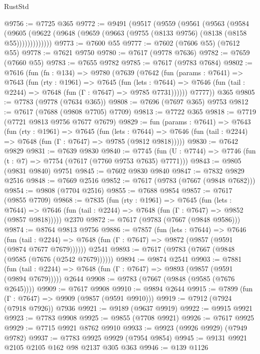 \begin{lexlean}{RustStd}
\begin{coremodule}
@9756 := @7725 @365
@9772 := @9491
    (@9517
      (@9559
        (@9561
          (@9563
            (@9584
              (@9605 (@9622 (@9648 (@9659 (@9663 (@9755 (@8133 @9756) (@8138 (@8158 @55)))))))))))))
@9773 := @7600 @55
@9777 := @7602 (@7606 @55) (@7612 @55)
@9778 := @7621 @9750
@9780 := @7617 (@9778 @7636)
@9782 := @7659 (@7660 @55)
@9783 := @7655 @9782
@9785 := @7617 (@9783 @7684)
@9802 := @7616
    (fun (fn : @134) =>
    @9780
      (@7639
        (@7642
          (fun (params : @7641) =>
          @7643
            (fun (rty : @1961) =>
            @7645
              (fun (lets : @7644) =>
              @7646 (fun (tail : @2244) => @7648 (fun (Γ : @7647) => @9785 @7731))))))
        @7777))
    @365
@9805 := @7783 (@9778 (@7634 @365))
@9808 := @7696 (@7697 @365) @9753
@9812 := @7617 (@7688 (@9808 @7705) @7709)
@9813 := @7722 @365
@9818 := @7719 (@7721 @9813 @9756 @7677 @7679)
@9829 := fun (params : @7641) =>
  @7643
    (fun (rty : @1961) =>
    @7645
      (fun (lets : @7644) =>
      @7646 (fun (tail : @2244) => @7648 (fun (Γ : @7647) => @9785 (@9812 @9818)))))
@9830 := @7642 @9829
@9831 := @7639 @9830
@9840 := @7745 (fun (U : @7744) => @7746 (fun (t : @7) => @7754 (@7617 (@7760 @9753 @7635) @7771)))
@9843 := @9805 (@9831 @9840) @9751
@9845 := @7602 @9830 @9840
@9847 := @7832 @9829 @2516
@9848 := @7669 @2516
@9852 := @7617 (@9783 (@7667 (@9848 @7682)))
@9854 := @9808 (@7704 @2516)
@9855 := @7688 @9854
@9857 := @7617 (@9855 @7709)
@9868 := @7835
    (fun (rty : @1961) =>
    @7645
      (fun (lets : @7644) =>
      @7646 (fun (tail : @2244) => @7648 (fun (Γ : @7647) => @9852 (@9857 @9818)))))
    @2370
@9872 := @7617 (@9783 (@7667 (@9848 @9586)))
@9874 := @8764 @9813 @9756
@9886 := @7857
    (fun (lets : @7644) =>
    @7646
      (fun (tail : @2244) => @7648 (fun (Γ : @7647) => @9872 (@9857 (@9591 (@9874 @7677 @7679))))))
    @2541
@9893 := @7617 (@9783 (@7667 (@9848 (@9585 (@7676 (@2542 @7679))))))
@9894 := @9874 @2541
@9903 := @7881
    (fun (tail : @2244) => @7648 (fun (Γ : @7647) => @9893 (@9857 (@9591 (@9894 @7679)))))
    @2644
@9908 := @9783 (@7667 (@9848 (@9585 (@7676 @2645))))
@9909 := @7617 @9908
@9910 := @9894 @2644
@9915 := @7899 (fun (Γ : @7647) => @9909 (@9857 (@9591 @9910)))
@9919 := @7912 (@7924 (@7918 @7926)) @7936
@9921 := @9189 (@9637 @9919)
@9922 := @9915 @9921
@9923 := @7783 @9908
@9925 := @9855 (@7708 @9921)
@9926 := @7617 @9925
@9929 := @7715 @9921 @8762 @9910
@9933 := @9923 (@9926 @9929) (@7949 @9782)
@9937 := @7783 @9925 @9929 (@7954 @9854)
@9945 := @9131 @9921 @2105 @2105 @162 @98 @2137 @305 @363
@9946 := @139 @1126

\end{coremodule}
\end{lexlean}
